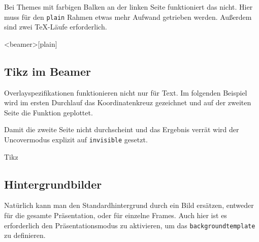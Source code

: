 Bei Themes mit farbigen Balken an der linken Seite funktioniert das nicht.
Hier muss für den \texttt{plain} Rahmen etwas mehr Aufwand getrieben werden.
Außerdem sind zwei \TeX-Läufe erforderlich.

\begin{lfgwcode}{}
\begin{frame}<beamer>[plain]
\end{frame}
\end{lfgwcode}

\subsection{Tikz im Beamer}

Overlayspezifikationen funktionieren nicht nur für Text.
Im folgenden Beispiel wird im ersten Durchlauf das Koordinatenkreuz
gezeichnet und auf der zweiten Seite die Funktion geplottet.

Damit die zweite Seite nicht durchscheint und das Ergebnis verrät wird der
Uncovermodus explizit auf \texttt{invisible} gesetzt.

\begin{lfgwcode}{}

\begin{frame}[fragile,label=tikz]{Tikz}
\end{frame}
\end{lfgwcode}

\subsection{Hintergrundbilder}

Natürlich kann man den Standardhintergrund durch ein Bild ersätzen, entweder
für die gesamte Präsentation, oder für einzelne Frames. Auch hier ist es
erforderlich den Präsentationsmodus zu aktivieren, um das
\texttt{backgroundtemplate} zu definieren.

